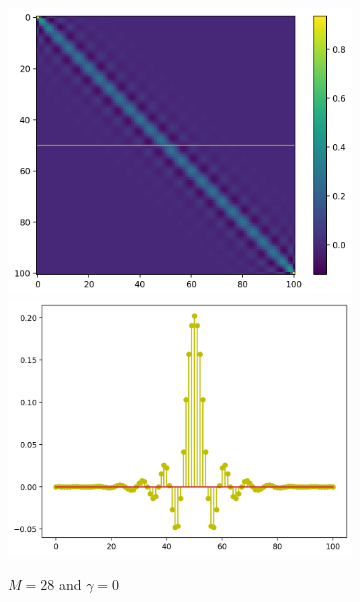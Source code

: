 \documentclass[10pt,twoside]{book}
\begin{document}
\begin{figure}
\begin{subfigure}{0.32\textwidth}
     \includegraphics[width=\textwidth]{smoothing_M28_gamma0_smoothingMatrix}
     \includegraphics[width=\textwidth]{smoothing_M28_gamma0_smoothingKernel}
     \caption{$M=28$ and $\gamma=0$}
     \label{fig:smoothing_M28_gamma0}
  \end{subfigure}
  \hfill
  \begin{subfigure}{0.32\textwidth}
     \centering

\end{subfigure}
\end{figure}
\end{document}
